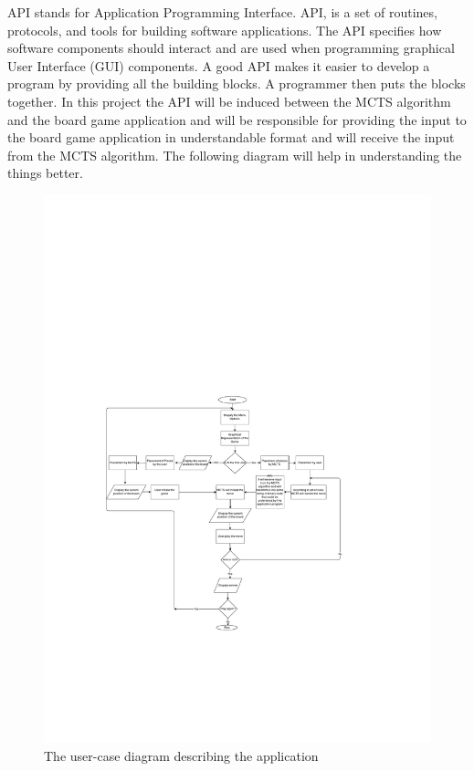 API stands for Application Programming Interface. API, is a set of routines, protocols, and tools for building software applications. The API specifies how software components should interact and are used when programming graphical User Interface (GUI) components. A good API makes it easier to develop a program by providing all the building blocks. A programmer then puts the blocks together.\bigbreak
 In this project the API will be induced between the MCTS algorithm and the board game application and will be responsible for providing the input to the board game application in understandable format and will receive the input from the MCTS algorithm. The following diagram will help in understanding the things better.

\bigbreak

\begin{figure}[!h]
\centering
\includegraphics[width=1.7\textwidth]{2General_Architecture/2.2API/flow.pdf}
\caption{The user-case diagram describing the application}
\label{fig:pieces}
\end{figure}


